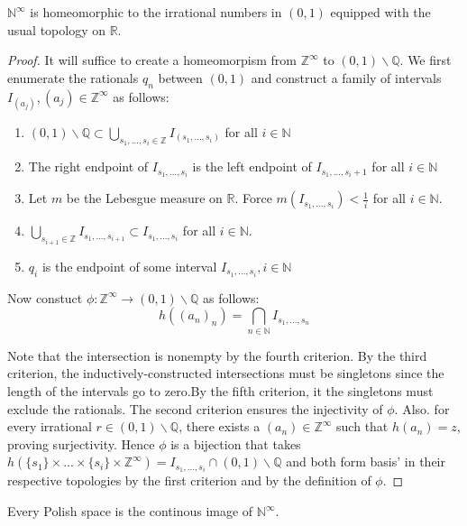 \documentclass[main.tex]{subfiles}
\begin{document}
\begin{proposition}
 $\mathbb{N}^{\infty}$ is homeomorphic to the irrational numbers in $(0,1)$ equipped with the usual topology on $\mathbb{R}$.
\end{proposition}

\begin{proof}
 It will suffice to create a homeomorpism from $\mathbb{Z}^{\infty}$ to $(0,1) \backslash \mathbb{Q}$. We first enumerate the rationals $q_n$ between $(0,1)$ and construct a family of intervals $I_{(a_j)}, (a_j) \in \mathbb{Z}^{\infty}$ as follows:
 \begin{enumerate}
  \item $(0,1) \backslash \mathbb{Q} \subset \bigcup_{s_1,...,s_i \in \mathbb{Z}} I_{(s_1,...,s_i)}$ for all $i \in \mathbb{N}$
  \item The right endpoint of $I_{s_1,...,s_i}$ is the left endpoint of $I_{s_1,...,s_i+1}$ for all $i \in \mathbb{N}$
  \item Let $m$ be the Lebesgue measure on $\mathbb{R}$. Force $m(I_{s_1,...,s_i}) < \frac{1}{i}$ for all $i \in \mathbb{N}$.
  \item $ \bigcup_{s_{i+1} \in \mathbb{Z}} I_{s_1,...,s_{i+1}} \subset I_{s_1,...,s_i}$ for all $i \in \mathbb{N}$.
  \item $q_i$ is the endpoint of some interval $I_{s_1,...,s_i}, i \in \mathbb{N}$
 \end{enumerate}
 
  Now constuct $\phi: \mathbb{Z}^{\infty} \rightarrow (0,1) \backslash \mathbb{Q}$
  as follows:
  $$h((a_n)_n) = \bigcap_{n \in \mathbb{N}} I_{s_1,...,s_n} $$

Note that the intersection is nonempty by the fourth criterion. By the third criterion, the inductively-constructed intersections must be singletons since the length of the intervals go to zero.By the fifth criterion, it the singletons must exclude the rationals. The second criterion ensures the injectivity of $\phi$. Also. for every irrational $r \in (0,1) \backslash \mathbb{Q}$, there exists a $(a_n) \in \mathbb{Z}^{\infty}$ such that $h(a_n) = z$, proving surjectivity. Hence $\phi$ is a bijection that takes $h(\{s_1\} \times ... \times \{s_i\} \times \mathbb{Z}^{\infty}) = I_{s_1,...,s_i} \cap (0,1) \backslash \mathbb{Q}$ and both form basis' in their respective topologies by the first criterion and by the definition of $\phi$.
\end{proof}

\begin{proposition}
Every Polish space is the continous image of $\mathbb{N}^{\infty}$.
\end{proposition}
\end{document}
